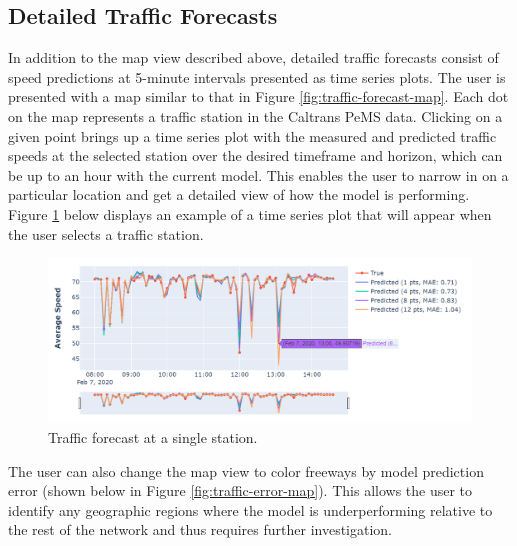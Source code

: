 \documentclass{article}
\begin{document}
\subsection{Detailed Traffic Forecasts}

In addition to the map view described above, detailed traffic forecasts consist of speed predictions at 5-minute intervals presented as time series plots. The user is presented with a map similar to that in Figure \ref{fig:traffic-forecast-map}. Each dot on the map represents a traffic station in the Caltrans PeMS data. Clicking on a given point brings up a time series plot with the measured and predicted traffic speeds at the selected station over the desired timeframe and horizon, which can be up to an hour with the current model. This enables the user to narrow in on a particular location and get a detailed view of how the model is performing. Figure \ref{fig:traffic-time-series} below displays an example of a time series plot that will appear when the user selects a traffic station.



\begin{figure}[hbt!]
	\centering
	\includegraphics[width=\textwidth]{images/traffic_time_series.png}
	\caption{Traffic forecast at a single station.}
	\label{fig:traffic-time-series}
\end{figure}

The user can also change the map view to color freeways by model prediction error (shown below in Figure \ref{fig:traffic-error-map}). This allows the user to identify any geographic regions where the model is underperforming relative to the rest of the network and thus requires further investigation.
\end{document}
